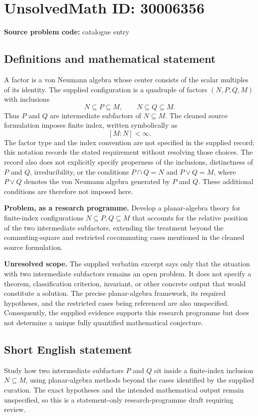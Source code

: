 \documentclass[11pt]{article}
\begin{document}
\section*{UnsolvedMath ID: 30006356}
\textbf{Source problem code:} catalogue entry
\subsection{Definitions and mathematical statement}
A factor is a von Neumann algebra whose center consists of the scalar multiples of its identity. The supplied configuration is a quadruple of factors \((N,P,Q,M)\) with inclusions
\[
N\subseteq P\subseteq M,\qquad N\subseteq Q\subseteq M.
\]
Thus \(P\) and \(Q\) are intermediate subfactors of \(N\subseteq M\). The cleaned source formulation imposes finite index, written symbolically as
\[
[M:N]<\infty.
\]
The factor type and the index convention are not specified in the supplied record; this notation records the stated requirement without resolving those choices. The record also does not explicitly specify properness of the inclusions, distinctness of \(P\) and \(Q\), irreducibility, or the conditions \(P\cap Q=N\) and \(P\vee Q=M\), where \(P\vee Q\) denotes the von Neumann algebra generated by \(P\) and \(Q\). These additional conditions are therefore not imposed here.

\textbf{Problem, as a research programme.} Develop a planar-algebra theory for finite-index configurations \(N\subseteq P,Q\subseteq M\) that accounts for the relative position of the two intermediate subfactors, extending the treatment beyond the commuting-square and restricted cocommuting cases mentioned in the cleaned source formulation.

\textbf{Unresolved scope.} The supplied verbatim excerpt says only that the situation with two intermediate subfactors remains an open problem. It does not specify a theorem, classification criterion, invariant, or other concrete output that would constitute a solution. The precise planar-algebra framework, its required hypotheses, and the restricted cases being referenced are also unspecified. Consequently, the supplied evidence supports this research programme but does not determine a unique fully quantified mathematical conjecture.
\subsection{Short English statement}
Study how two intermediate subfactors \(P\) and \(Q\) sit inside a finite-index inclusion \(N\subseteq M\), using planar-algebra methods beyond the cases identified by the supplied curation. The exact hypotheses and the intended mathematical output remain unspecified, so this is a statement-only research-programme draft requiring review.
\end{document}
